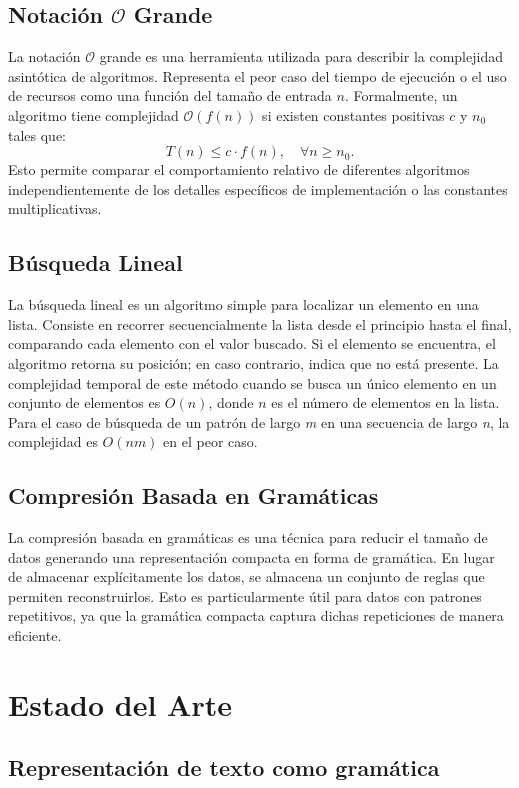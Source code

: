 \section{Notación $\mathcal{O}$ Grande}
La notación $\mathcal{O}$ grande es una herramienta utilizada para describir la complejidad 
asintótica de algoritmos. Representa el peor caso del tiempo de ejecución o el uso 
de recursos como una función del tamaño de entrada $n$. Formalmente, un algoritmo tiene 
complejidad $\mathcal{O}(f(n))$ si existen constantes positivas $c$ y $n_0$ tales que:
\[
T(n) \leq c \cdot f(n), \quad \forall n \geq n_0.
\]
Esto permite comparar el comportamiento relativo de diferentes algoritmos independientemente 
de los detalles específicos de implementación o las constantes multiplicativas.

\section{Búsqueda Lineal}
La búsqueda lineal es un algoritmo simple para localizar un elemento en una lista. Consiste 
en recorrer secuencialmente la lista desde el principio hasta el final, comparando cada 
elemento con el valor buscado. Si el elemento se encuentra, el algoritmo retorna su posición; 
en caso contrario, indica que no está presente. La complejidad temporal de este método 
cuando se busca un único elemento  en un conjunto de elementos es $O(n)$, donde $n$ es el número de elementos en la lista. Para el caso de búsqueda de un patrón de largo \textit{m} en una secuencia de largo \textit{n}, la complejidad es $O(nm)$ en el peor caso.

\section{Compresión Basada en Gramáticas}
La compresión basada en gramáticas es una técnica para reducir el tamaño de datos 
generando una representación compacta en forma de gramática. En lugar de almacenar 
explícitamente los datos, se almacena un conjunto de reglas que permiten reconstruirlos. 
Esto es particularmente útil para datos con patrones repetitivos, ya que la gramática 
compacta captura dichas repeticiones de manera eficiente.

\chapter{Estado del Arte}

\section{Representación de texto como gramática}

